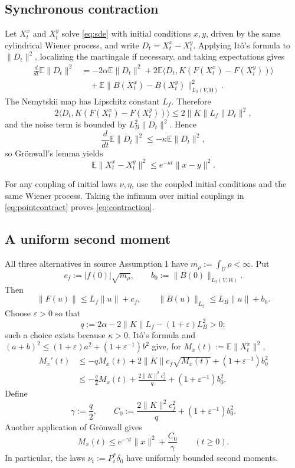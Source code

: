 \documentclass[11pt]{article}
\newcommand{\HH}{\mathsf H}
\newcommand{\E}{\mathbb E}
\begin{document}
\subsection{Synchronous contraction}

Let \(X_t^x\) and \(X_t^y\) solve \eqref{eq:sde} with initial conditions
\(x,y\), driven by the same cylindrical Wiener process, and write
\(D_t=X_t^x-X_t^y\).  Applying It\^o's formula to \(\lVert D_t\rVert^2\),
localizing the martingale if necessary, and taking expectations gives
\begin{align*}
 \frac{d}{dt}\E\lVert D_t\rVert^2
 &=-2\alpha\E\lVert D_t\rVert^2
 +2\E\langle D_t,K(F(X_t^x)-F(X_t^y))\rangle\\
 &\quad+\E\lVert B(X_t^x)-B(X_t^y)\rVert_{L_2(V,\HH)}^2.
\end{align*}
The Nemytskii map has Lipschitz constant \(L_f\).  Therefore
\[
 2\langle D_t,K(F(X_t^x)-F(X_t^y))\rangle
 \le 2\lVert K\rVert L_f\lVert D_t\rVert^2,
\]
and the noise term is bounded by \(L_B^2\lVert D_t\rVert^2\).  Hence
\[
 \frac{d}{dt}\E\lVert D_t\rVert^2
 \le-\kappa\E\lVert D_t\rVert^2,
\]
so Gr\"onwall's lemma yields
\begin{equation}\label{eq:pointcontract}
 \E\lVert X_t^x-X_t^y\rVert^2
 \le e^{-\kappa t}\lVert x-y\rVert^2.
\end{equation}

For any coupling of initial laws \(\nu,\eta\), use the coupled initial
conditions and the same Wiener process.  Taking the infimum over initial
couplings in \eqref{eq:pointcontract} proves \eqref{eq:contraction}.

\subsection{A uniform second moment}

All three alternatives in source Assumption 1 have
\(m_\rho:=\int_U\rho<\infty\).  Put
\[
 c_f:=|f(0)|\sqrt{m_\rho},\qquad b_0:=\lVert B(0)\rVert_{L_2(V,\HH)}.
\]
Then
\[
 \lVert F(u)\rVert\le L_f\lVert u\rVert+c_f,
 \qquad \lVert B(u)\rVert_{L_2}\le L_B\lVert u\rVert+b_0.
\]
Choose \(\varepsilon>0\) so that
\[
 q:=2\alpha-2\lVert K\rVert L_f-(1+\varepsilon)L_B^2>0;
\]
such a choice exists because \(\kappa>0\).  It\^o's formula and
\((a+b)^2\le(1+\varepsilon)a^2+(1+\varepsilon^{-1})b^2\) give, for
\(M_x(t):=\E\lVert X_t^x\rVert^2\),
\begin{align*}
 M_x'(t)
 &\le-qM_x(t)+2\lVert K\rVert c_f\sqrt{M_x(t)}
 +(1+\varepsilon^{-1})b_0^2\\
 &\le-\frac q2M_x(t)
 +\frac{2\lVert K\rVert^2c_f^2}{q}
 +(1+\varepsilon^{-1})b_0^2.
\end{align*}
Define
\[
 \gamma:=\frac q2,
 \qquad C_0:=\frac{2\lVert K\rVert^2c_f^2}{q}
 +(1+\varepsilon^{-1})b_0^2.
\]
Another application of Gr\"onwall gives
\begin{equation}\label{eq:moment}
 M_x(t)\le e^{-\gamma t}\lVert x\rVert^2+\frac{C_0}{\gamma}
 \qquad(t\ge0).
\end{equation}
In particular, the laws \(\nu_t:=P_t^*\delta_0\) have uniformly bounded
second moments.
\end{document}
